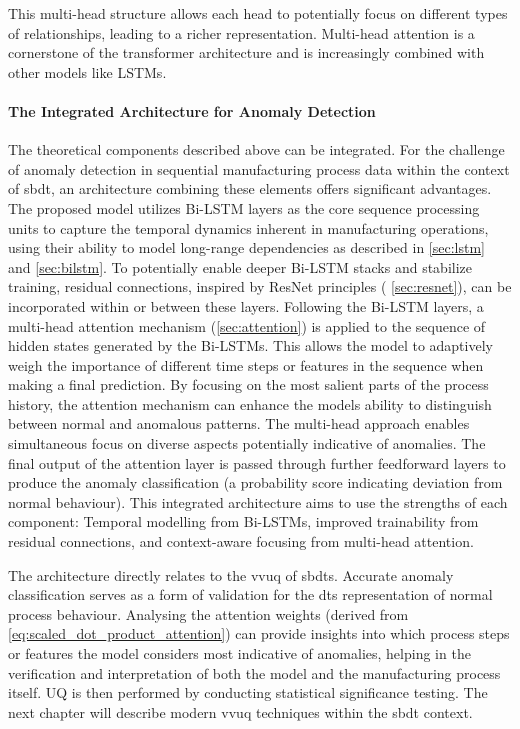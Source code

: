This multi-head structure allows each head to potentially focus on different types of relationships, leading to a richer representation. Multi-head attention is a cornerstone of the transformer architecture \autocite{vaswani2017attention} and is increasingly combined with other models like LSTMs.

\paragraph{\textbf{The Integrated Architecture for Anomaly Detection}}
\label{sec:integrated_architecture}

The theoretical components described above can be integrated. For the challenge of anomaly detection in sequential manufacturing process data within the context of \gls{sbdt}, an architecture combining these elements offers significant advantages. The proposed model utilizes Bi-LSTM layers as the core sequence processing units to capture the temporal dynamics inherent in manufacturing operations, using their ability to model long-range dependencies as described in \autoref{sec:lstm} and \autoref{sec:bilstm}. To potentially enable deeper Bi-LSTM stacks and stabilize training, residual connections, inspired by ResNet principles ( \autoref{sec:resnet}), can be incorporated within or between these layers. Following the Bi-LSTM layers, a multi-head attention mechanism (\autoref{sec:attention}) is applied to the sequence of hidden states generated by the Bi-LSTMs. This allows the model to adaptively weigh the importance of different time steps or features in the sequence when making a final prediction. By focusing on the most salient parts of the process history, the attention mechanism can enhance the models ability to distinguish between normal and anomalous patterns. The multi-head approach enables simultaneous focus on diverse aspects potentially indicative of anomalies. The final output of the attention layer is passed through further feedforward layers to produce the anomaly classification (a probability score indicating deviation from normal behaviour). This integrated architecture aims to use the strengths of each component: Temporal modelling from Bi-LSTMs, improved trainability from residual connections, and context-aware focusing from multi-head attention.

The architecture directly relates to the \gls{vvuq} of \gls{sbdt}s. Accurate anomaly classification serves as a form of validation for the \gls{dt}s representation of normal process behaviour. Analysing the attention weights (derived from \autoref{eq:scaled_dot_product_attention}) can provide insights into which process steps or features the model considers most indicative of anomalies, helping in the verification and interpretation of both the model and the manufacturing process itself. UQ is then performed by conducting statistical significance testing. The next chapter will describe modern \gls{vvuq} techniques within the \gls{sbdt} context.


